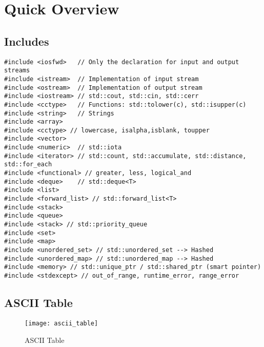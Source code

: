 \tableofcontents
\pagebreak

\section{Quick Overview}

\subsection{Includes}

\begin{lstlisting}
#include <iosfwd> 	// Only the declaration for input and output streams
#include <istream>  // Implementation of input stream
#include <ostream>  // Implementation of output stream
#include <iostream> // std::cout, std::cin, std::cerr
#include <cctype>   // Functions: std::tolower(c), std::isupper(c)
#include <string>   // Strings
#include <array>
#include <cctype> // lowercase, isalpha,isblank, toupper
#include <vector>
#include <numeric>  // std::iota
#include <iterator> // std::count, std::accumulate, std::distance, std::for_each
#include <functional> // greater, less, logical_and
#include <deque>    // std::deque<T>
#include <list>
#include <forward_list> // std::forward_list<T>
#include <stack>
#include <queue>
#include <stack> // std::priority_queue
#include <set>
#include <map>
#include <unordered_set> // std::unordered_set --> Hashed
#include <unordered_map> // std::unordered_map --> Hashed
#include <memory> // std::unique_ptr / std::shared_ptr (smart pointer)
#include <stdexcept> // out_of_range, runtime_error, range_error
\end{lstlisting}

\pagebreak

\subsection{ASCII Table}
\begin{figure}[h!]
  \center
  \texttt{[image: ascii\_table]}
  \caption{ASCII Table}
\end{figure}

\pagebreak
